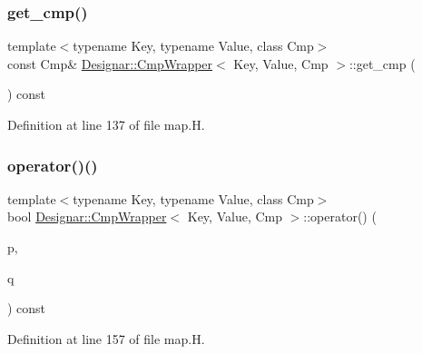 \subsubsection{\texorpdfstring{get\+\_\+cmp()}{get\_cmp()}\hspace{0.1cm}{\footnotesize\ttfamily [2/2]}}
{\footnotesize\ttfamily template$<$typename Key, typename Value, class Cmp$>$ \\
const Cmp\& \hyperlink{class_designar_1_1_cmp_wrapper}{Designar\+::\+Cmp\+Wrapper}$<$ Key, Value, Cmp $>$\+::get\+\_\+cmp (\begin{DoxyParamCaption}{ }\end{DoxyParamCaption}) const\hspace{0.3cm}{\ttfamily [inline]}}



Definition at line 137 of file map.\+H.

\mbox{\label{class_designar_1_1_cmp_wrapper_a1b715375bf0bdd7ffefdb8ada447c191}} 
\subsubsection{\texorpdfstring{operator()()}{operator()()}}
{\footnotesize\ttfamily template$<$typename Key, typename Value, class Cmp$>$ \\
bool \hyperlink{class_designar_1_1_cmp_wrapper}{Designar\+::\+Cmp\+Wrapper}$<$ Key, Value, Cmp $>$\+::operator() (\begin{DoxyParamCaption}\item[{const \hyperlink{namespace_designar_a7394b1b25278abf7211e77b91eb5204f}{Map\+Key}$<$ Key, Value $>$ \&}]{p,  }\item[{const \hyperlink{namespace_designar_a7394b1b25278abf7211e77b91eb5204f}{Map\+Key}$<$ Key, Value $>$ \&}]{q }\end{DoxyParamCaption}) const\hspace{0.3cm}{\ttfamily [inline]}}



Definition at line 157 of file map.\+H.

\mbox{\label{class_designar_1_1_cmp_wrapper_a958a9c52db5cc8e9b809af0adc4f90f4}} 
